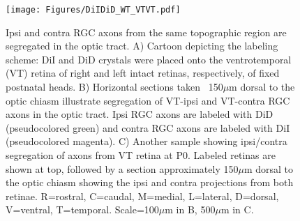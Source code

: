 \begin{figure}[hbtp]
    \begin{center}
        \texttt{[image: Figures/DiIDiD\_WT\_VTVT.pdf]}
        \caption[Ipsi and contra RGC axons from the same topographic region are segregated in the optic tract.]
        {Ipsi and contra RGC axons from the same topographic region are segregated in the optic tract.
        A) Cartoon depicting the labeling scheme: DiI and DiD crystals were placed onto the ventrotemporal (VT) retina of right and left intact retinas, respectively, of fixed postnatal heads.
        B) Horizontal sections taken ~150$\mu$m dorsal to the optic chiasm illustrate segregation of VT-ipsi and VT-contra RGC axons in the optic tract.
        Ipsi RGC axons are labeled with DiD (pseudocolored green) and contra RGC axons are labeled with DiI (pseudocolored magenta).
        C) Another sample showing ipsi/contra segregation of axons from VT retina at P0.
        Labeled retinas are shown at top, followed by a section approximately 150$\mu$m dorsal to the optic chiasm showing the ipsi and contra projections from both retinae.
        R=rostral, C=caudal, M=medial, L=lateral, D=dorsal, V=ventral, T=temporal.
        Scale=100$\mu$m in B, 500$\mu$m in C.}
        \label{Figures/DiIDiDWTVTVT}
    \end{center}
\end{figure}